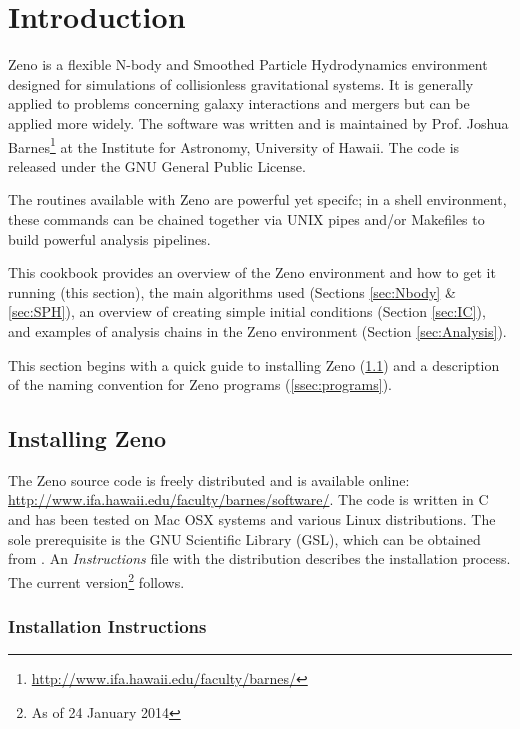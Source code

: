 \section{Introduction}
\label{sec:Introduction}

Zeno is a flexible N-body and Smoothed Particle Hydrodynamics environment designed for simulations of collisionless gravitational systems.
It is generally applied to problems concerning galaxy interactions and mergers but can be applied more widely.
The software was written and is maintained by Prof. Joshua Barnes\footnote{\url{http://www.ifa.hawaii.edu/faculty/barnes/}} at the Institute for Astronomy, University of Hawaii.
The code is released under the GNU General Public License.

The routines available with Zeno are powerful yet specifc; in a shell environment, these commands can be chained together via UNIX pipes and/or Makefiles to build powerful analysis pipelines.

This cookbook provides an overview of the Zeno environment and how to get it running (this section), the main algorithms used (Sections \ref{sec:Nbody} \& \ref{sec:SPH}), an overview of creating simple initial conditions (Section \ref{sec:IC}), and examples of analysis chains in the Zeno environment (Section \ref{sec:Analysis}).

This section begins with a quick guide to installing Zeno (\ref{ssec:installing}) and a description of the naming convention for Zeno programs (\ref{ssec:programs}).

\subsection{Installing Zeno}
\label{ssec:installing}

The Zeno source code is freely distributed and is available online: \url{http://www.ifa.hawaii.edu/faculty/barnes/software/}. The code is written in C and has been tested on Mac OSX systems and various Linux distributions. The sole prerequisite is the GNU Scientific Library (GSL), which can be obtained from \url{}{}. An \textit{Instructions} file with the distribution describes the installation process. The current version\footnote{As of 24 January 2014} follows.

\subsubsection{Installation Instructions}

